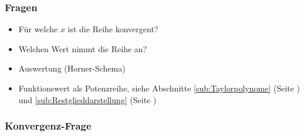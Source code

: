 \subsubsection*{Fragen}

\begin{itemize}
   \item Für welche $x$ ist die Reihe konvergent?
   \item Welchen Wert nimmt die Reihe an?
   \item Auswertung \checkmark (Horner-Schema)
   \item Funktionswert als Potenzreihe, siehe Abschnitte \ref{sub:Taylorpolynome} (Seite \pageref{sub:Taylorpolynome}) und \ref{sub:Restglieddarstellung} (Seite \pageref{sub:Restglieddarstellung})
\end{itemize}

\subsubsection*{Konvergenz-Frage}

